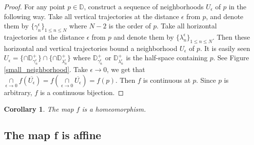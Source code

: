 \documentclass{amsart}
\theoremstyle{plain}
\newtheorem{Corollary}{Corollary}[section]
\theoremstyle{definition}
\theoremstyle{remark}
\begin{document}
\begin{proof}
For any point $p \in \mathbb{D}$, construct a sequence of neighborhoods $U_\epsilon$ of $p$ in the following way.  Take all vertical trajectories at the distance $\epsilon$ from $p$, and denote them by $\{\gamma^\epsilon_n\}_{1 \le n \le N}$ where $N-2$ is the order of $p$.  Take all horizontal trajectories at the distance $\epsilon$ from $p$ and denote them by $\{\lambda^\epsilon_n\}_{1 \le n \le N}$.  Then these horizontal and vertical trajectories bound a neighborhood $U_\epsilon$ of $p$.  It is easily seen $U_\epsilon=\{\cap \mathbb{D}^+_{\gamma^\epsilon_n}\} \cap  \{\cap \mathbb{D}^+_{\lambda^\epsilon_n}\}$ where $\mathbb{D}^+_{\gamma^\epsilon_n}$ or $\mathbb{D}^+_{\lambda^\epsilon_n}$ is the half-space containing $p$.  See Figure \ref{small_neighborhood}.  Take $\epsilon \to 0$, we get that $\mathop{\cap} \limits_{\epsilon \to 0} f(\overline{U_\epsilon}) = f(\mathop{\cap} \limits_{\epsilon \to 0} \overline{U_\epsilon})= f(p)$.  Then $f$ is continuous at $p$.  Since $p$ is arbitrary, $f$ is a continuous bijection. 
\end{proof}
\begin{Corollary}
    The map $f$ is a homeomorphism.
\end{Corollary}
% 
% 
% 
\subsection{The map f is affine}
\end{document}
